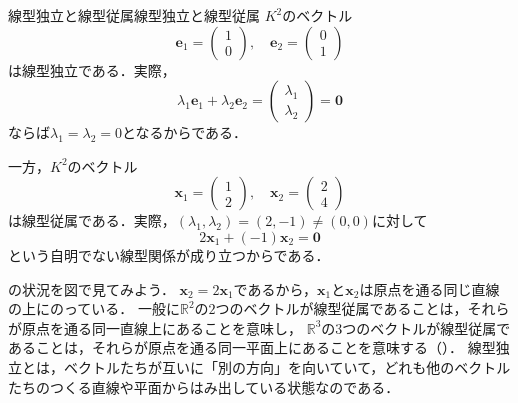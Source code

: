 \begin{example}{線型独立と線型従属}{線型独立と線型従属}
  $K^2$のベクトル
  \[
    \bm{e}_1 = \begin{pmatrix} 1 \\ 0 \end{pmatrix}, \quad
    \bm{e}_2 = \begin{pmatrix} 0 \\ 1 \end{pmatrix}
  \]
  は線型独立である．実際，
  \[
    \lambda_1 \bm{e}_1 + \lambda_2 \bm{e}_2 = \begin{pmatrix} \lambda_1 \\ \lambda_2 \end{pmatrix} = \bm{0}
  \]
  ならば$\lambda_1 = \lambda_2 = 0$となるからである．

  一方，$K^2$のベクトル
  \[
    \bm{x}_1 = \begin{pmatrix} 1 \\ 2 \end{pmatrix}, \quad
    \bm{x}_2 = \begin{pmatrix} 2 \\ 4 \end{pmatrix}
  \]
  は線型従属である．実際，$(\lambda_1, \lambda_2) = (2, -1) \ne (0, 0)$に対して
  \[
    2\bm{x}_1 + (-1)\bm{x}_2 = \bm{0}
  \]
  という自明でない線型関係が成り立つからである．
\end{example}

の状況を図で見てみよう．
$\bm{x}_2 = 2\bm{x}_1$であるから，$\bm{x}_1$と$\bm{x}_2$は原点を通る同じ直線の上にのっている．
一般に$\mathbb{R}^2$の$2$つのベクトルが線型従属であることは，それらが原点を通る同一直線上にあることを意味し，
$\mathbb{R}^3$の$3$つのベクトルが線型従属であることは，それらが原点を通る同一平面上にあることを意味する（）．
線型独立とは，ベクトルたちが互いに「別の方向」を向いていて，どれも他のベクトルたちのつくる直線や平面からはみ出している状態なのである．

